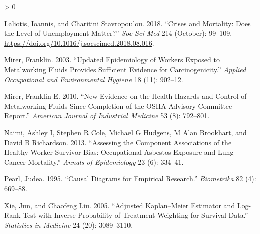 \documentclass[
  11pt,
]{article}
\newlength{\cslhangindent}
\newenvironment{CSLReferences}[2] %
 {%
  \setlength{\parindent}{0pt}
  \ifodd #1 \everypar{\setlength{\hangindent}{\cslhangindent}}\ignorespaces\fi
  \ifnum #2 > 0
  \setlength{\parskip}{#2\baselineskip}
  \fi
 }%
 {}
\begin{document}
\begin{CSLReferences}{1}{0}
\leavevmode\hypertarget{ref-Laliotis_2018}{}%
Laliotis, Ioannis, and Charitini Stavropoulou. 2018. {``Crises and
Mortality: Does the Level of Unemployment Matter?''} \emph{Soc Sci Med}
214 (October): 99--109.
\url{https://doi.org/10.1016/j.socscimed.2018.08.016}.

\leavevmode\hypertarget{ref-Mirer_2003}{}%
Mirer, Franklin. 2003. {``Updated Epidemiology of Workers Exposed to
Metalworking Fluids Provides Sufficient Evidence for Carcinogenicity.''}
\emph{Applied Occupational and Environmental Hygiene} 18 (11): 902--12.

\leavevmode\hypertarget{ref-Mirer_2010}{}%
Mirer, Franklin E. 2010. {``New Evidence on the Health Hazards and
Control of Metalworking Fluids Since Completion of the OSHA Advisory
Committee Report.''} \emph{American Journal of Industrial Medicine} 53
(8): 792--801.

\leavevmode\hypertarget{ref-Naimi_2013}{}%
Naimi, Ashley I, Stephen R Cole, Michael G Hudgens, M Alan Brookhart,
and David B Richardson. 2013. {``Assessing the Component Associations of
the Healthy Worker Survivor Bias: Occupational Asbestos Exposure and
Lung Cancer Mortality.''} \emph{Annals of Epidemiology} 23 (6): 334--41.

\leavevmode\hypertarget{ref-Pearl_1995}{}%
Pearl, Judea. 1995. {``Causal Diagrams for Empirical Research.''}
\emph{Biometrika} 82 (4): 669--88.

\leavevmode\hypertarget{ref-Xie_2005}{}%
Xie, Jun, and Chaofeng Liu. 2005. {``Adjusted Kaplan--Meier Estimator
and Log-Rank Test with Inverse Probability of Treatment Weighting for
Survival Data.''} \emph{Statistics in Medicine} 24 (20): 3089--3110.

\end{CSLReferences}
\end{document}
